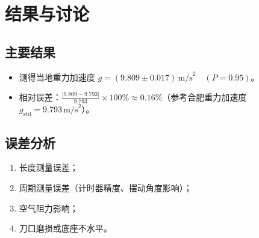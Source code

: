 \documentclass[12pt,a4paper]{article}
\begin{document}
\section{结果与讨论}
\subsection*{主要结果}
\begin{itemize}
    \item 测得当地重力加速度 $g = (9.809 \pm 0.017) \,\text{m/s}^2 \quad (P=0.95)$。
    \item 相对误差：$\frac{|9.809 - 9.793|}{9.793} \times 100\% \approx 0.16\%$（参考合肥重力加速度 $g_{\text{std}}=9.793\,\text{m/s}^2$）。
\end{itemize}

\subsection*{误差分析}
\begin{enumerate}
    \item 长度测量误差；
    \item 周期测量误差（计时器精度、摆动角度影响）；
    \item 空气阻力影响；
    \item 刀口磨损或底座不水平。
\end{enumerate}
\end{document}
